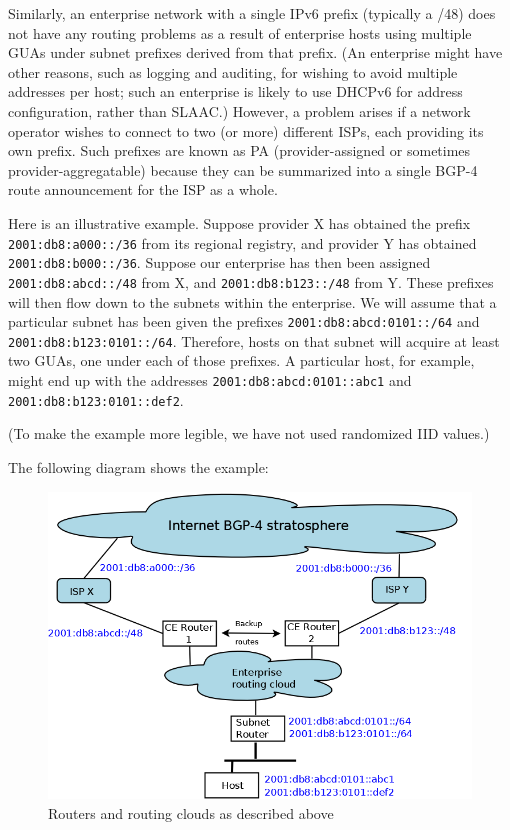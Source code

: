 \documentclass[
]{article}
\begin{document}
Similarly, an enterprise network with a single IPv6 prefix (typically a
/48) does not have any routing problems as a result of enterprise hosts
using multiple GUAs under subnet prefixes derived from that prefix. (An
enterprise might have other reasons, such as logging and auditing, for
wishing to avoid multiple addresses per host; such an enterprise is
likely to use DHCPv6 for address configuration, rather than SLAAC.)
However, a problem arises if a network operator wishes to connect to two
(or more) different ISPs, each providing its own prefix. Such prefixes
are known as PA (provider-assigned or sometimes provider-aggregatable)
because they can be summarized into a single BGP-4 route announcement
for the ISP as a whole.

Here is an illustrative example. Suppose provider X has obtained the
prefix \texttt{2001:db8:a000::/36} from its regional registry, and
provider Y has obtained \texttt{2001:db8:b000::/36}. Suppose our
enterprise has then been assigned \texttt{2001:db8:abcd::/48} from X,
and \texttt{2001:db8:b123::/48} from Y. These prefixes will then flow
down to the subnets within the enterprise. We will assume that a
particular subnet has been given the prefixes
\texttt{2001:db8:abcd:0101::/64} and \texttt{2001:db8:b123:0101::/64}.
Therefore, hosts on that subnet will acquire at least two GUAs, one
under each of those prefixes. A particular host, for example, might end
up with the addresses \texttt{2001:db8:abcd:0101::abc1} and
\texttt{2001:db8:b123:0101::def2}.

(To make the example more legible, we have not used randomized IID
values.)

The following diagram shows the example:

\begin{figure}
\centering
\includegraphics{multiPrefix.png}
\caption{Routers and routing clouds as described above}
\end{figure}
\end{document}
